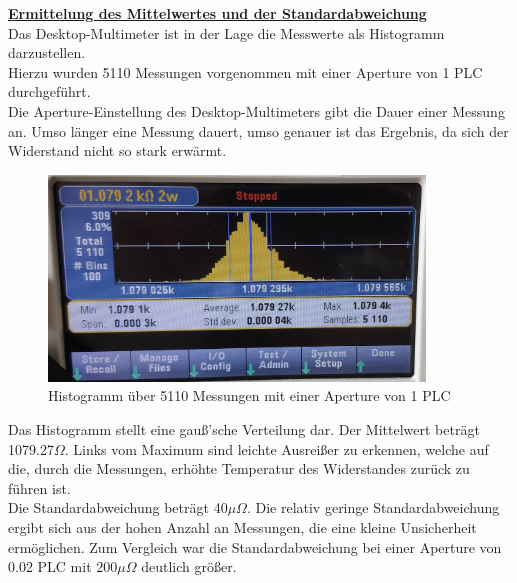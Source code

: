 \documentclass[a4paper,12pt]{article}
\begin{document}
	\newline
	\noindent
	\underline{\textbf{Ermittelung des Mittelwertes und der Standardabweichung}}\\ \newline
	Das Desktop-Multimeter ist in der Lage die Messwerte als Histogramm darzustellen.\\
	Hierzu wurden 5110 Messungen vorgenommen mit einer Aperture von 1 PLC durchgeführt.\\ Die Aperture-Einstellung des Desktop-Multimeters gibt die Dauer einer Messung an. Umso länger eine Messung dauert, umso genauer ist das Ergebnis, da sich der Widerstand nicht so stark erwärmt.\\ \newline
	\begin{figure}[h]
		\centering
		\includegraphics[width=10cm]{assets/digitalmultimeter}
		\caption{Histogramm über 5110 Messungen mit einer Aperture von 1 PLC}
	\end{figure}
	Das Histogramm stellt eine gauß'sche Verteilung dar. Der Mittelwert beträgt 1079.27$\Omega$. Links vom Maximum sind leichte Ausreißer zu erkennen, welche auf die, durch die Messungen, erhöhte Temperatur des Widerstandes zurück zu führen ist.\\ Die Standardabweichung beträgt 40$\mu\Omega$. Die relativ geringe Standardabweichung ergibt sich aus der hohen Anzahl an Messungen, die eine kleine Unsicherheit ermöglichen.\newline
	Zum Vergleich war die Standardabweichung bei einer Aperture von 0.02 PLC mit $200\mu\Omega$ deutlich größer. \newpage
\end{document}

